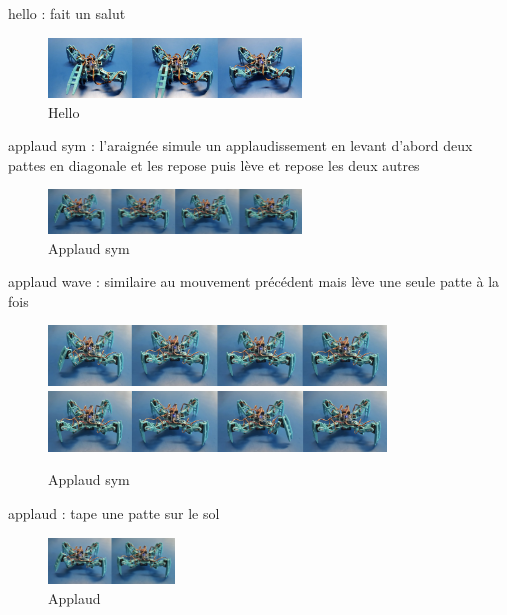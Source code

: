 hello : fait un salut

\begin{figure}[H]
	\begin{center}
		\includegraphics[width=0.6\textwidth]{./img/hello}
		\caption{Hello}
	\end{center}
\end{figure}

applaud sym : l'araignée simule un applaudissement en levant d'abord deux pattes en diagonale et les repose puis lève et 
repose les deux autres

\begin{figure}[H]
	\begin{center}
		\includegraphics[width=0.6\textwidth]{./img/applaud_sym}
		\caption{Applaud sym}
	\end{center}
\end{figure}

applaud wave : similaire au mouvement précédent mais lève une seule patte à la fois

\begin{figure}[H]
	\begin{center}
		\includegraphics[width=0.8\textwidth]{./img/applaud_wave_1}
		\includegraphics[width=0.8\textwidth]{./img/applaud_wave_2}
		\caption{Applaud sym}
	\end{center}
\end{figure}

applaud : tape une patte sur le sol

\begin{figure}[H]
	\begin{center}
		\includegraphics[width=0.3\textwidth]{./img/applaud}
		\caption{Applaud}
	\end{center}
\end{figure}

